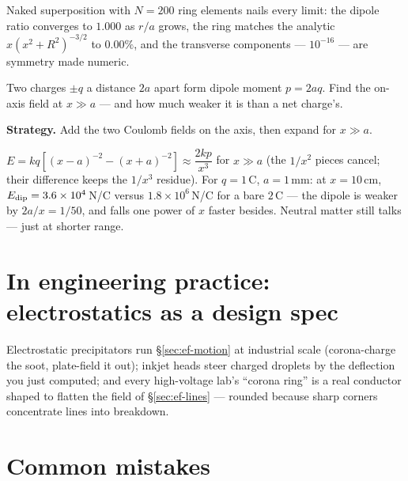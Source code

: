 Naked superposition with $N=200$ ring elements nails every limit: the
dipole ratio converges to $1.000$ as $r/a$ grows, the ring matches the
analytic $x(x^{2}+R^{2})^{-3/2}$ to $0.00\%$, and the transverse
components --- $10^{-16}$ --- are symmetry made numeric.

\begin{example}\label{ex:dipole}
Two charges $\pm q$ a distance $2a$ apart form dipole moment
$p=2aq$. Find the on-axis field at $x\gg a$ --- and how much weaker
it is than a net charge's.
\par\smallskip
\textbf{Strategy.} Add the two Coulomb fields on the axis, then expand
for $x\gg a$.
\begin{solution}
$E=kq\left[(x-a)^{-2}-(x+a)^{-2}\right]
\approx\dfrac{2kp}{x^{3}}$ for $x\gg a$ (the $1/x^{2}$ pieces cancel;
their difference keeps the $1/x^{3}$ residue).
For $q=1$\,\textmu C, $a=1$\,mm: at $x=10$\,cm,
$E_{\rm dip}=3.6\times10^{4}$\,N/C versus $1.8\times10^{6}$\,N/C for
a bare $2$\,\textmu C --- the dipole is weaker by $2a/x=1/50$, and
falls one power of $x$ faster besides. Neutral matter still talks
--- just at shorter range. \checkmark
\end{solution}
\end{example}

\section{In engineering practice: electrostatics as a design spec}\label{sec:ef-eng}

Electrostatic precipitators run \S\ref{sec:ef-motion} at industrial
scale (corona-charge the soot, plate-field it out); inkjet heads steer
charged droplets by the deflection you just computed; and every high-voltage
lab's ``corona ring'' is a real conductor shaped to flatten the field
of \S\ref{sec:ef-lines} --- rounded because sharp corners concentrate
lines into breakdown.

\section{Common mistakes}\label{sec:ef-mistakes}

